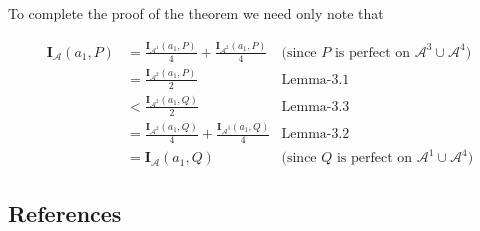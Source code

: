 \documentclass[
  10pt,
  letterpaper,
  DIV=11,
  numbers=noendperiod,
  twoside]{scrartcl}
\begin{document}
To complete the proof of the theorem we need only note that

\[
\begin{aligned}
\mathbf{I}_{\mathscr{A}}(a_1, P) &= \frac{\mathbf{I}_{\mathscr{A}^1}(a_1, P)}{4} + \frac{\mathbf{I}_{\mathscr{A}^2}(a_1, P)}{4} &\text{(since }P\text{ is perfect on }\mathscr{A}^3 \cup \mathscr{A}^4) \\
&= \frac{\mathbf{I}_{\mathscr{A}^2}(a_1, P)}{2} &\text{Lemma-3.1} \\
&< \frac{\mathbf{I}_{\mathscr{A}^2}(a_1, Q)}{2} &\text{Lemma-3.3} \\
&= \frac{\mathbf{I}_{\mathscr{A}^2}(a_1, Q)}{4} + \frac{\mathbf{I}_{\mathscr{A}^3}(a_1, Q)}{4} &\text{Lemma-3.2} \\
&= \mathbf{I}_{\mathscr{A}}(a_1, Q) &\text{(since }Q\text{ is perfect on }\mathscr{A}^1 \cup \mathscr{A}^4)
\end{aligned}
\]

\subsection*{References}\label{references}
\end{document}
